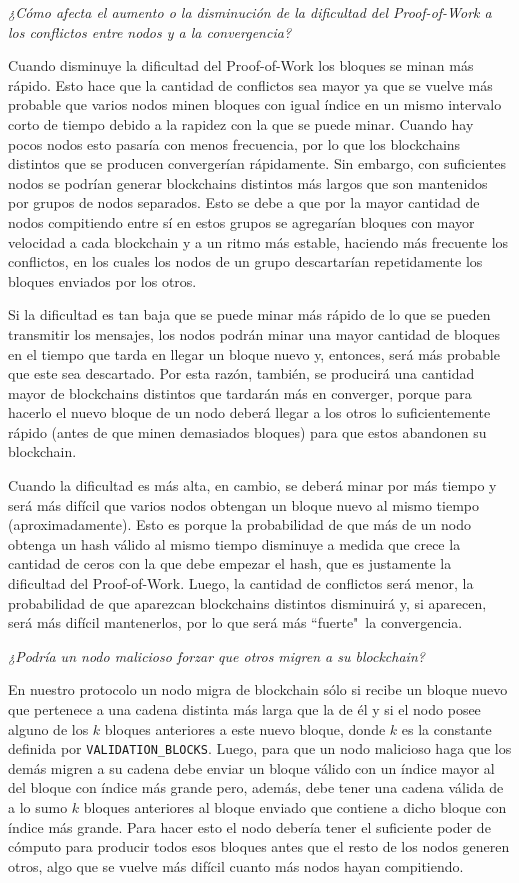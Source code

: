 \emph{¿Cómo afecta el aumento o la disminución de la dificultad del Proof-of-Work a los conflictos entre nodos y a la convergencia?}

Cuando disminuye la dificultad del Proof-of-Work los bloques se minan más rápido. Esto hace que la cantidad de conflictos sea mayor ya que se vuelve más probable que varios nodos minen bloques con igual índice en un mismo intervalo corto de tiempo debido a la rapidez con la que se puede minar. Cuando hay pocos nodos esto pasaría con menos frecuencia, por lo que los blockchains distintos que se producen convergerían rápidamente. Sin embargo, con suficientes nodos se podrían generar blockchains distintos más largos que son mantenidos por grupos de nodos separados. Esto se debe a que por la mayor cantidad de nodos compitiendo entre sí en estos grupos se agregarían bloques con mayor velocidad a cada blockchain y a un ritmo más estable, haciendo más frecuente los conflictos, en los cuales los nodos de un grupo descartarían repetidamente los bloques enviados por los otros.

Si la dificultad es tan baja que se puede minar más rápido de lo que se pueden transmitir los mensajes, los nodos podrán minar una mayor cantidad de bloques en el tiempo que tarda en llegar un bloque nuevo y, entonces, será más probable que este sea descartado. Por esta razón, también, se producirá una cantidad mayor de blockchains distintos que tardarán más en converger, porque para hacerlo el nuevo bloque de un nodo deberá llegar a los otros lo suficientemente rápido (antes de que minen demasiados bloques) para que estos abandonen su blockchain.

Cuando la dificultad es más alta, en cambio, se deberá minar por más tiempo y será más difícil que varios nodos obtengan un bloque nuevo al mismo tiempo (aproximadamente). Esto es porque la probabilidad de que más de un nodo obtenga un hash válido al mismo tiempo disminuye a medida que crece la cantidad de ceros con la que debe empezar el hash, que es justamente la dificultad del Proof-of-Work. Luego, la cantidad de conflictos será menor, la probabilidad de que aparezcan blockchains distintos disminuirá y, si aparecen, será más difícil mantenerlos, por lo que será más ``fuerte"\ la convergencia.

\emph{¿Podría un nodo malicioso forzar que otros migren a su blockchain?}

En nuestro protocolo un nodo migra de blockchain sólo si recibe un bloque nuevo que pertenece a una cadena distinta más larga que la de él y si el nodo posee alguno de los $k$ bloques anteriores a este nuevo bloque, donde $k$ es la constante definida por \texttt{VALIDATION\_BLOCKS}. Luego, para que un nodo malicioso haga que los demás migren a su cadena debe enviar un bloque válido con un índice mayor al del bloque con índice más grande pero, además, debe tener una cadena válida de a lo sumo $k$ bloques anteriores al bloque enviado que contiene a dicho bloque con índice más grande. Para hacer esto el nodo debería tener el suficiente poder de cómputo para producir todos esos bloques antes que el resto de los nodos generen otros, algo que se vuelve más difícil cuanto más nodos hayan compitiendo.